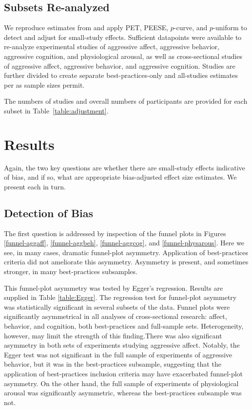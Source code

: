 \documentclass[man, mask]{apa6}
\begin{document}
\subsection{Subsets Re-analyzed}
We reproduce estimates from \citet{Anderson:etal:2010} and apply PET, PEESE, $p$-curve, and $p$-uniform to detect and adjust for small-study effects. Sufficient datapoints were available to re-analyze experimental studies of aggressive affect, aggressive behavior, aggressive cognition, and physiological arousal, as well as cross-sectional studies of aggressive affect, aggressive behavior, and aggressive cognition. Studies are further divided to create separate best-practices-only and all-studies estimates per \citet{Anderson:etal:2010} as sample sizes permit. 

The numbers of studies and overall numbers of participants are provided for each subset in Table~\ref{table:adjustment}.

\section{Results}
Again, the two key questions are whether there are small-study effects indicative of bias, and if so, what are appropriate bias-adjusted effect size estimates. We present each in turn.  

\subsection{Detection of Bias}
The first question is addressed by inspection of the funnel plots in Figures \ref{funnel-aggaff}, \ref{funnel-aggbeh}, \ref{funnel-aggcog}, and \ref{funnel-physarous}.  Here we see, in many cases, dramatic funnel-plot asymmetry. Application of best-practices criteria did not ameliorate this asymmetry. Asymmetry is present, and sometimes stronger, in many best-practices subsamples.

This funnel-plot asymmetry was tested by Egger's regression. Results are supplied in Table \ref{table:Egger}. 
The regression test for funnel-plot asymmetry was statistically significant in several subsets of the data. Funnel plots were significantly asymmetrical in all analyses of cross-sectional research: affect, behavior, and cognition, both best-practices and full-sample sets. Heterogeneity, however, may limit the strength of this finding.There was also significant asymmetry in both sets of experiments studying aggressive affect.
Notably, the Egger test was not significant in the full sample of experiments of aggressive behavior, but it was in the best-practices subsample, suggesting that the application of best-practices inclusion criteria may have exacerbated funnel-plot asymmetry. On the other hand, the full sample of experiments of physiological arousal was significantly asymmetric, whereas the best-practices subsample was not.
\end{document}
